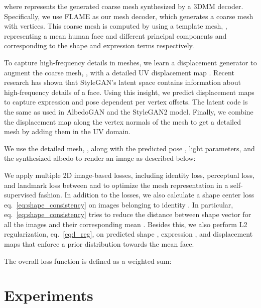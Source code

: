 \documentclass[10pt,twocolumn,letterpaper]{article}
\begin{document}
where  represents the generated coarse mesh synthesized by a 3DMM decoder. Specifically, we use FLAME \cite{flame} as our mesh decoder, which generates a coarse mesh with  vertices. This coarse mesh is computed by using a template mesh, , representing a mean human face and different principal components  and  corresponding to the shape and expression terms respectively.


To capture high-frequency details in meshes, we learn a displacement generator  to augment the coarse mesh, , with a detailed UV displacement map . Recent research \cite{latent_space2, latent_space1} has shown that StyleGAN's latent space contains information about high-frequency details of a face. Using this insight, we predict displacement maps to capture expression and pose dependent per vertex offsets. The latent code  is the same as used in AlbedoGAN and the StyleGAN2 model. Finally, we combine the displacement map along the vertex normals of the mesh  to get a detailed mesh  by adding them in the UV domain. 



We use the detailed mesh, , along with the predicted pose , light  parameters, and the synthesized albedo  to render an image  as described below:



We apply multiple 2D image-based losses, including identity loss, perceptual loss, and landmark loss between  and  to optimize the mesh representation in a self-supervised fashion. 
In addition to the losses, we also calculate a shape center loss eq.~\ref{eq:shape_consistency} on images belonging to identity . In particular, eq.~\ref{eq:shape_consistency} tries to reduce the distance between shape vector for all the images and their corresponding mean .
Besides this, we also perform L2 regularization, eq.~\ref{eq:l_reg}, on predicted shape , expression , and displacement maps  that enforce a prior distribution towards the mean face.




The overall loss function  is defined as a weighted sum:















\section{Experiments}
\end{document}
